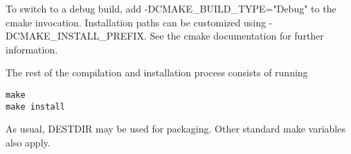 To switch to a debug build, add -DCMAKE\_BUILD\_TYPE="Debug" to the cmake
invocation. Installation paths can be customized using -DCMAKE\_INSTALL\_PREFIX.
See the cmake documentation for further information.

The rest of the compilation and installation process consists of running

\begin{verbatim}
make
make install
\end{verbatim}

As usual, DESTDIR may be used for packaging. Other standard make variables also
apply.

